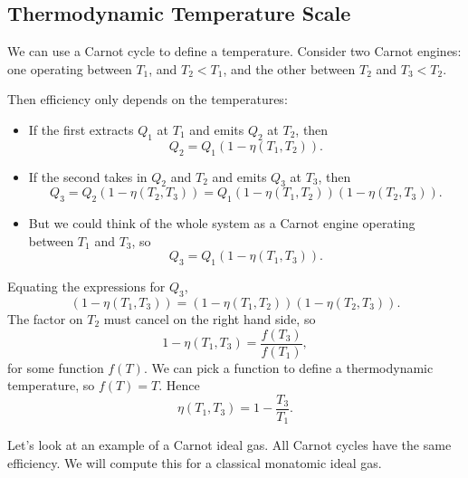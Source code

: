 \documentclass[12pt]{article}
\begin{document}
\subsection{Thermodynamic Temperature Scale}
\label{sub:tts}

We can use a Carnot cycle to define a temperature. Consider two Carnot engines: one operating between $T_1$, and $T_2 < T_1$, and the other between $T_2$ and $T_3 < T_2$.

Then efficiency only depends on the temperatures:
\begin{itemize}
	\item If the first extracts $Q_1$ at $T_1$ and emits $Q_2$ at $T_2$, then
		\[
		Q_2 = Q_1(1 - \eta(T_1, T_2)).
		\]
	\item If the second takes in $Q_2$ and $T_2$ and emits $Q_3$ at $T_3$, then
		\[
		Q_3 = Q_2(1 - \eta(T_2, T_3)) = Q_1(1 - \eta(T_1, T_2))(1 - \eta(T_2, T_3)).
		\]
	\item But we could think of the whole system as a Carnot engine operating between $T_1$ and $T_3$, so
		\[
		Q_3 = Q_1(1 - \eta(T_1, T_3)).
		\]
\end{itemize}

Equating the expressions for $Q_3$,
\[
	(1 - \eta(T_1, T_3)) = (1 - \eta(T_1, T_2))(1 - \eta(T_2, T_3)).
\]
The factor on $T_2$ must cancel on the right hand side, so
\[
1 - \eta(T_1, T_3) = \frac{f(T_3)}{f(T_1)},
\]
for some  function $f(T)$. We can pick a function to define a thermodynamic temperature, so $f(T) = T$. Hence
\[
\eta(T_1, T_3) = 1 - \frac{T_3}{T_1}.
\]

Let's look at an example of a Carnot ideal gas. All Carnot cycles have the same efficiency. We will compute this for a classical monatomic ideal gas.
\end{document}
